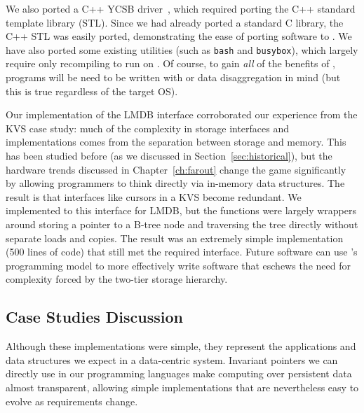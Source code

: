 We also ported a C++ YCSB driver~\cite{ycsbc}, which required porting the C++ standard template
library (STL). Since we had already ported a standard C library, the C++ STL was easily ported,
demonstrating the ease of porting software to \Twizzler.
We have also ported some existing \unix utilities (such as \texttt{bash} and
\texttt{busybox}), which largely require only recompiling to run on \Twizzler. Of
course, to gain \emph{all} of the benefits of \Twizzler, programs will be need to be
written with \NVM or data disaggregation in mind (but this is true regardless of the target OS).

Our implementation of the LMDB interface
corroborated our experience from the KVS case study: much of the complexity in storage interfaces
and implementations comes from the separation between storage and memory. This has been
studied before (as we discussed in Section~\ref{sec:historical}), but the hardware trends discussed in Chapter~\ref{ch:farout} change the game
significantly by allowing programmers to think directly via in-memory data structures. The result is
that interfaces like cursors in a KVS become redundant. We implemented to this interface
for LMDB, but the functions were largely wrappers around storing a pointer
to a B-tree node and traversing the tree directly without separate loads and copies. The result was
an extremely simple implementation (500 lines of code) that still met the required interface. Future software
can use \Twizzler's programming model to more effectively write software
that eschews the need for complexity forced by the two-tier storage hierarchy.



\subsection{Case Studies Discussion}

Although these implementations were simple, they represent the applications
and data structures we expect in a data-centric system. Invariant pointers
we can directly use in our programming languages make computing over persistent
data almost transparent, allowing simple implementations that are nevertheless
easy to evolve as requirements change.

